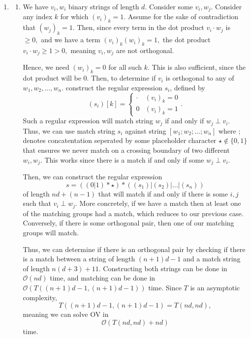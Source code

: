\documentclass[12pt]{article}
\begin{document}
\begin{enumerate}
  \item
    \begin{enumerate}
      \item We have $v_i, w_i$ binary strings of length $d.$ Consider
        some $v_i, w_j.$ Consider any index $k$ for which $(v_i)_k =
        1.$ Assume for the sake of contradiction that $(w_j)_k = 1.$
        Then, since every term in the dot product $v_i \cdot w_j$ is
        $\geq 0,$ and we have a term $(v_i)_k(w_i)_k = 1,$ the dot
        product $v_i \cdot w_j \geq 1 > 0,$ meaning $v_i, w_j$ are
        not orthogonal.

        Hence, we need $(w_i)_k = 0$ for all such $k$. This is also
        sufficient, since the dot product will be $0.$ Then, to
        determine if $v_i$ is orthogonal to any of $w_1, w_2, \ldots,
        w_n.$ construct the regular expression $s_i$, defined by
        $$
        (s_i)[k] =
        \begin{cases}
          \cdot &  (v_i)_k = 0 \\
          0 & (v_i)_k = 1
        \end{cases}.
        $$
        Such a regular expression will match string $w_j$ if and only
        if $w_j \perp v_i.$ Thus, we can use match string $s_i$
        against string $[w_1 ; w_2 ; \ldots ;w_n]$ where $;$ denotes
        concatentation seperated by some placeholder character $\star
        \not \in \{0, 1\}$ that ensures we never match on a crossing
        boundary of two different $w_i, w_j.$ This works since there
        is a match if and only if some $ w_j \perp v_i.$

        Then, we can construct the regular expression
        $$
        s = ((0|1)*\star)*((s_1) | (s_2) | \ldots | (s_n))
        $$
        of length $nd + (n-1 )$ that will match if and only if there
        is some $i, j$ such that $v_i \perp w_j.$  More concretely,
        if we have a match then at least one of the matching groups
        had a match, which reduces to our previous case. Conversely,
        if there is some orthogonal pair, then one of our matching
        groups will match.

        Thus, we can determine if there is an orthogonal pair by
        checking if there is a match between a string of length $(n +
        1)d - 1$ and a match string of length $n(d+ 3) + 11.$
        Constructing both strings can be done in $\mathcal O(nd)$
        time, and matching can be done in $\mathcal O(T((n+1)d - 1,
        (n+1)d - 1))$ time. Since $T$ is an asymptotic complexity,
        $$
        T((n+1)d - 1, (n+1)d  -1) = T(nd, nd),
        $$
        meaning we can solve OV in $$
        \mathcal O(T(nd, nd) + nd)
        $$
        time.


\end{enumerate}
\end{enumerate}
\end{document}
